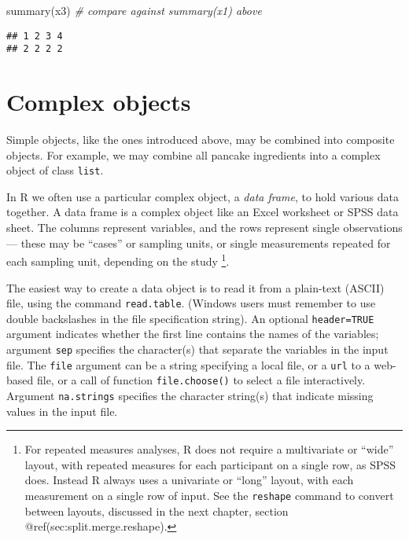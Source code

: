 \documentclass[
]{book}
\newenvironment{Shaded}{\begin{snugshade}}{\end{snugshade}}
\newcommand{\CommentTok}[1]{\textcolor[rgb]{0.56,0.35,0.01}{\textit{#1}}}
\newcommand{\FunctionTok}[1]{\textcolor[rgb]{0.00,0.00,0.00}{#1}}
\newcommand{\NormalTok}[1]{#1}
\begin{document}
\begin{Shaded}
\begin{Highlighting}[]
\FunctionTok{summary}\NormalTok{(x3) }\CommentTok{\# compare against summary(x1) above }
\end{Highlighting}
\end{Shaded}

\begin{verbatim}
## 1 2 3 4 
## 2 2 2 2
\end{verbatim}

\hypertarget{sec:complex.objects}{%
\section{Complex objects}\label{sec:complex.objects}}

Simple objects, like the ones introduced above, may be combined into
composite objects. For example, we may combine all pancake ingredients
into a complex object of class \texttt{list}.

In R we often use a particular complex object, a \emph{data
frame}, to hold various data together. A data frame is a complex object
like an Excel worksheet or SPSS data sheet. The columns represent
variables, and the rows represent single observations --- these may be
``cases'' or sampling units, or single measurements repeated for each
sampling unit, depending on the study
\footnote{For repeated measures analyses, R does not require a multivariate or ``wide'' layout, with repeated measures for each participant on a single row, as SPSS does. Instead R always uses a univariate or ``long'' layout, with each measurement on a single row of input. See the \texttt{reshape} command to convert between layouts, discussed in the next chapter, section @ref(sec:split.merge.reshape).}.

The easiest way to create a data object is to read it from a plain-text
(ASCII) file, using the command \texttt{read.table}.
(Windows users must remember to use double backslashes in the file
specification string). An optional \texttt{header=TRUE}
argument indicates whether the first line contains the names of the
variables; argument \texttt{sep} specifies the
character(s) that separate the variables in the input file. The
\texttt{file} argument can be a string specifying a
local file, or a \texttt{url} to a web-based file, or a
call of function \texttt{file.choose()} to select a file
interactively. Argument \texttt{na.strings} specifies
the character string(s) that indicate missing values in the input file.
\end{document}
